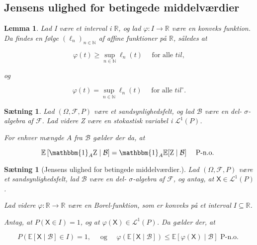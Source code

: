 \documentclass{article}
\newcommand{\1}{\mathbbm{1}}
\newcommand{\X}{\mathsf{X}}
\theoremstyle{boxed}
\newtheorem{lemma}[theorem]{Lemma}
\newtheorem{proposition}[theorem]{Sætning}
\begin{document}
\subsection{Jensens ulighed for betingede middelværdier}
\begin{theorem-box}
    \begin{lemma}
        Lad I være et interval i $\mathbb{R}$, og lad $\varphi: I \rightarrow \mathbb{R}$ være en konveks funktion.
Da findes en følge $\left(\ell_n\right)_{n \in \mathbb{N}}$ af affine funktioner på $\mathbb{R}$, således at

$$
\varphi(t) \geq \sup _{n \in \mathbb{N}} \ell_n(t) \quad \text { for alle } t i l,
$$

og

$$
\varphi(t)=\sup _{n \in \mathbb{N}} \ell_n(t) \quad \text { for alle } t i l^{\circ} .
$$

    \end{lemma}
\end{theorem-box}
\begin{theorem-box}
    \begin{proposition}
        Lad $(\Omega, \mathcal{F}, P)$ være et sandsynlighedsfelt, og lad $\mathcal{B}$ være en del- $\sigma$-algebra af $\mathcal{F}$. Lad videre Z være en stokastisk variabel i $\mathcal{L}^1(P)$.

For enhver mængde $A$ fra $\mathcal{B}$ gælder der da, at

$$
\mathbb{E}\left[\1_A \mathrm{Z} \mid \mathcal{B}\right]=\1_A \mathbb{E}[\mathrm{Z} \mid \mathcal{B}] \quad \text { P-n.o. }
$$

    \end{proposition}
\end{theorem-box}
\begin{theorem-box}
    \begin{proposition}[Jensens ulighed for betingede middelværdier.]
        Lad $(\Omega, \mathcal{F}, P)$ være et sandsynlighedsfelt, lad $\mathcal{B}$ være en del- $\sigma$-algebra af $\mathcal{F}$, og antag, at $\X \in \mathcal{L}^1(P)$.

Lad videre $\varphi: \mathbb{R} \rightarrow \mathbb{R}$ være en Borel-funktion, som er konveks på et interval $I \subseteq \mathbb{R}$.

Antag, at $P(\X \in I)=1$, og at $\varphi(\X) \in \mathcal{L}^1(P)$.
Da gælder der, at

$$
P(\mathbb{E}[\X \mid \mathcal{B}] \in I)=1, \quad \text { og } \quad \varphi(\mathbb{E}[\X \mid \mathcal{B}]) \leq \mathbb{E}[\varphi(\X) \mid \mathcal{B}] \text { P-n.o. }
$$
    \end{proposition}
\end{theorem-box}
\end{document}
